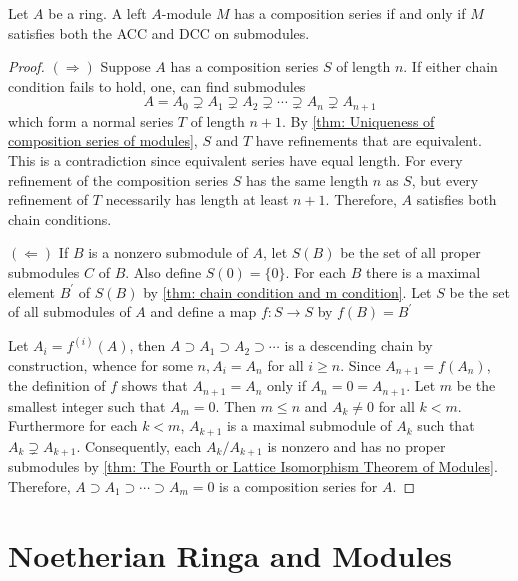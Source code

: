 \begin{theorem}
    \label{thm: Existence of composition series of modules}
    Let $A$ be a ring.
    A left $A$-module $M$ has a composition series if and only if $M$ satisfies both the ACC and DCC on submodules.
    \begin{proof}
        $(\Rightarrow)$ Suppose $A$ has a composition series $S$ of length $n$. If either chain condition fails to hold, one, can find submodules
        \begin{equation*}
            A=A_0 \supsetneq A_1 \supsetneq A_2 \supsetneq \cdots \supsetneq A_n \supsetneq A_{n+1}
        \end{equation*}
        which form a normal series $T$ of length $n+1$. By \ref{thm: Uniqueness of composition series of modules}, $S$ and $T$ have refinements that are equivalent. This is a contradiction since equivalent series have equal length. For every refinement of the composition series $S$ has the same length $n$ as $S$, but every refinement of $T$ necessarily has length at least $n+1$. Therefore, $A$ satisfies both chain conditions.

        $(\Leftarrow)$ If $B$ is a nonzero submodule of $A$, let $S(B)$ be the set of all proper submodules $C$ of $B$.
        Also define $S(0)=\{0\}$.
        For each $B$ there is a maximal element $B^{\prime}$ of $S(B)$ by \ref{thm: chain condition and m condition}. Let $S$ be the set of all submodules of $A$ and define a map $f: S \rightarrow S$ by $f(B)=B^{\prime}$

        Let $A_i=f^{(i)}\left(A\right)$, then $A \supset A_1 \supset A_2 \supset \cdots$ is a descending chain by construction, whence for some $n, A_i=A_n$ for all $i \geq n$.
        Since $A_{n+1}=f\left(A_n\right)$, the definition of $f$ shows that $A_{n+1}=A_n$ only if $A_n=0=A_{n+1}$. Let $m$ be the smallest integer such that $A_m=0$. Then $m \leq n$ and $A_k \neq 0$ for all $k<m$. Furthermore for each $k<m$, $A_{k+1}$ is a maximal submodule of $A_k$ such that $A_k \supsetneq A_{k+1}$. Consequently, each $A_k / A_{k+1}$ is nonzero and has no proper submodules by \ref{thm: The Fourth or Lattice Isomorphism Theorem of Modules}. Therefore, $A \supset A_1 \supset \cdots \supset A_m=0$ is a composition series for $A$.
    \end{proof}
\end{theorem}

\chapter{Noetherian Ringa and Modules} %

